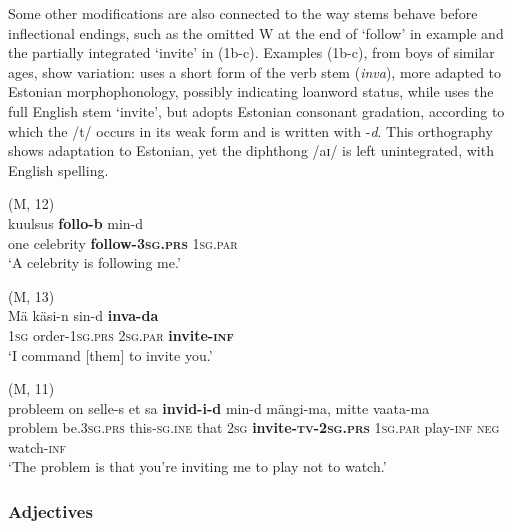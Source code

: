 \documentclass[output=paper]{langscibook}
\begin{document}
Some other modifications are also connected to the way stems behave before inflectional endings, such as the omitted W at the end of ‘follow’ in example  and the partially integrated ‘invite’ in (1b-c). Examples (1b-c), from boys of similar ages, show variation:  uses a short form of the verb stem (\textit{inva}), more adapted to Estonian morphophonology, possibly indicating loanword status, while  uses the full English stem ‘invite’, but adopts Estonian consonant gradation, according to which the /t/ occurs in its weak form and is written with -\textit{d}. This orthography shows adaptation to Estonian, yet the diphthong /aɪ/ is left unintegrated, with English spelling.

\ea%
    \label{ex:vihmanetal:1}
\ea   (M, 12)\\ \label{ex:vihmanetal:1a}
 kuulsus \textbf{{follo-b}} min-d\\
one    celebrity  \textbf{follow{}-3}\textbf{\textsc{sg.prs}}  1\textsc{sg.par}\\
\glt  ‘A celebrity is following me.’

\ex  (M, 13)\\ \label{ex:vihmanetal:1b}
\gll Mä   käsi-n     sin-d     \textbf{{inva-da}}\\
1\textsc{sg}  order-1\textsc{sg.prs}  2\textsc{sg.par}  \textbf{invite-\textsc{inf}}\\
\glt ‘I command [them] to invite you.’

\ex  (M, 11)\\ \label{ex:vihmanetal:1c}
\gll probleem  on    selle-s    et  sa \textbf{{invid-i-d}}    min-d    mängi-ma,  mitte vaata-ma\\
problem  be.3\textsc{sg.prs}   this-\textsc{sg.ine}   that  2\textsc{sg} \textbf{invite-\textsc{tv-2sg.prs}}   1\textsc{sg.par}   play-\textsc{inf}   \textsc{neg} watch-\textsc{inf}\\
\glt ‘The problem is that you’re inviting me to play not to watch.’
\z
\z



\subsubsection{Adjectives}
\end{document}
